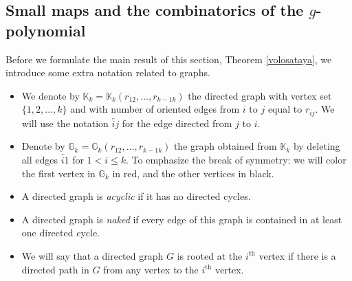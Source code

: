 \documentclass[11pt]{article}
\theoremstyle{definition}
\numberwithin{equation}{section}
\begin{document}
\subsection{Small maps and the combinatorics of the \texorpdfstring{$g$}{g}-polynomial}\label{S4.2}
Before we  formulate the main result of this section, Theorem \ref{volosataya}, 
we introduce some extra notation related to graphs. 
\begin{itemize}
\item We denote by $\mathbb{K}_k=\mathbb{K}_k(r_{12}, \ldots ,r_{k-1 k})$ the directed graph with vertex set $\{1, 
2, \ldots ,k\}$ and with number of oriented edges from $i$ to $j$ equal to 
$r_{ij}$.  
 We will use the notation $\overleftarrow{ij}$ for the edge directed from $j$ 
 to $i$. 

\item Denote by  $\mathbb{G}_k=\mathbb{G}_k(r_{12}, \ldots ,r_{k-1 k})$ the graph obtained from $\mathbb{K}_k$  by 
deleting all edges $\overleftarrow{i1}$ for $1<i\leq k$. To emphasize the break 
of 
symmetry: we will color the first vertex in $\mathbb{G}_k$ in red,
and the other vertices in black. 



\item A directed graph is \textit{acyclic} if it has no directed cycles. 

\item A directed graph is \textit{naked} if every edge of this graph is contained in at least one directed cycle.

\item We will say that a directed graph $G$ is rooted at the $i^{\text{th}}$ 
vertex if there is a directed path in $G$ from any vertex to the 
$i^{\text{th}}$ vertex. 
\end{itemize}
\end{document}
